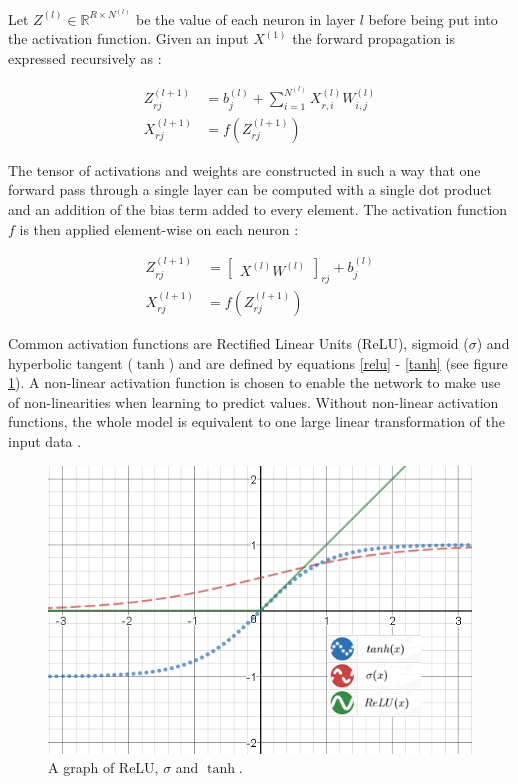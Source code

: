 \documentclass[a4paper, twoside]{article}
\begin{document}
Let $Z^{(l)} \in \mathbb{R}^{R \times N^{(l)}}$ be the value of each neuron in layer $l$ before being put into the activation function. Given an input $X^{(1)}$ the forward propagation is expressed recursively as \cite{cs231n} \cite{wikiStanford}:

\begin{align}
Z_{rj}^{(l+1)} & = b^{(l)}_j + \sum^{N^{(l)}}_{i = 1} X^{(l)}_{r,i} W^{(l)}_{i,j}\\
X_{rj}^{(l+1)} & = f(Z_{rj}^{(l+1)})
\end{align}

The tensor of activations and weights are constructed in such a way that one forward pass through a single layer can be computed with a single dot product and an addition of the bias term added to every element. The activation function $f$ is then applied element-wise on each neuron \cite{cs231n} \cite{wikiStanford}:

\begin{align}
Z_{rj}^{(l+1)} & = \begin{bmatrix}
X^{(l)}W^{(l)}
\end{bmatrix}_{rj}+b^{(l)}_j \\
X_{rj}^{(l+1)} & = f(Z_{rj}^{(l+1)})
\end{align}

Common activation functions are Rectified Linear Units (ReLU), sigmoid ($\sigma$) and hyperbolic tangent ($\tanh$) and are defined by equations \eqref{relu} - \eqref{tanh} (see figure \ref{activation_function}). A non-linear activation function is chosen to enable the network to make use of non-linearities when learning to predict values. Without non-linear activation functions, the whole model is equivalent to one large linear transformation of the input data \cite{cs231n}.
\\
\begin{figure}[h]
	\centering
  		\includegraphics[scale=0.73]{activationfunction.png}
  	\caption{A graph of ReLU, $\sigma$ and $\tanh$.} \label{activation_function}
\end{figure}
\end{document}
